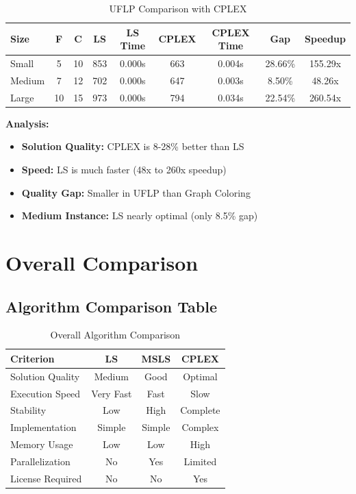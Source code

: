 \documentclass[12pt,a4paper]{article}
\begin{document}
\begin{table}[h]
\centering
\caption{UFLP Comparison with CPLEX}
\begin{tabular}{|l|c|c|c|c|c|c|c|c|}
\hline
\textbf{Size} & \textbf{F} & \textbf{C} & \textbf{LS} & \textbf{LS Time} & \textbf{CPLEX} & \textbf{CPLEX Time} & \textbf{Gap} & \textbf{Speedup} \\
\hline
Small & 5 & 10 & 853 & 0.000s & 663 & 0.004s & 28.66\% & 155.29x \\
Medium & 7 & 12 & 702 & 0.000s & 647 & 0.003s & 8.50\% & 48.26x \\
Large & 10 & 15 & 973 & 0.000s & 794 & 0.034s & 22.54\% & 260.54x \\
\hline
\end{tabular}
\end{table}

\textbf{Analysis:}
\begin{itemize}
    \item \textbf{Solution Quality:} CPLEX is 8-28\% better than LS
    \item \textbf{Speed:} LS is much faster (48x to 260x speedup)
    \item \textbf{Quality Gap:} Smaller in UFLP than Graph Coloring
    \item \textbf{Medium Instance:} LS nearly optimal (only 8.5\% gap)
\end{itemize}

\section{Overall Comparison}

\subsection{Algorithm Comparison Table}

\begin{table}[h]
\centering
\caption{Overall Algorithm Comparison}
\begin{tabular}{|l|c|c|c|}
\hline
\textbf{Criterion} & \textbf{LS} & \textbf{MSLS} & \textbf{CPLEX} \\
\hline
Solution Quality & Medium & Good & Optimal \\
Execution Speed & Very Fast & Fast & Slow \\
Stability & Low & High & Complete \\
Implementation & Simple & Simple & Complex \\
Memory Usage & Low & Low & High \\
Parallelization & No & Yes & Limited \\
License Required & No & No & Yes \\
\hline
\end{tabular}
\end{table}
\end{document}

